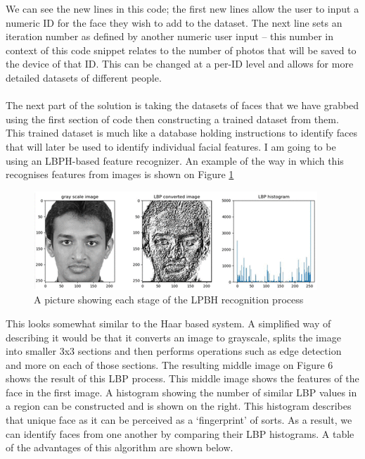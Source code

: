 \documentclass[9pt]{article}
\begin{document}
We can see the new lines in this code; the first new lines allow the user to input a numeric ID for the face they wish to add to the dataset. The next line sets an iteration number as defined by another numeric user input – this number in context of this code snippet relates to the number of photos that will be saved to the device of that ID. This can be changed at a per-ID level and allows for more detailed datasets of different people. \\\\
The next part of the solution is taking the datasets of faces that we have grabbed using the first section of code then constructing a trained dataset from them.  This trained dataset is much like a database holding instructions to identify faces that will later be used to identify individual facial features. I am going to be using an LBPH-based feature recognizer. An example of the way in which this recognises features from images is shown on Figure \ref{fig_LBPH}
\begin{figure}[H]
	\centering
	\includegraphics{lbphRecognition.png}
	\caption{A picture showing each stage of the LPBH recognition process \cite{lbphDiagram}}\label{fig_LBPH}
\end{figure}
This looks somewhat similar to the Haar based system. A simplified way of describing it would be that it converts an image to grayscale, splits the image into smaller 3x3 sections and then performs operations such as edge detection and more on each of those sections. The resulting middle image on Figure 6 shows the result of this LBP process. This middle image shows the features of the face in the first image. A histogram showing the number of similar LBP values in a region can be constructed and is shown on the right. This histogram describes that unique face as it can be perceived as a ‘fingerprint’ of sorts. As a result, we can identify faces from one another by comparing their LBP histograms. A table of the advantages of this algorithm are shown below.
\end{document}
